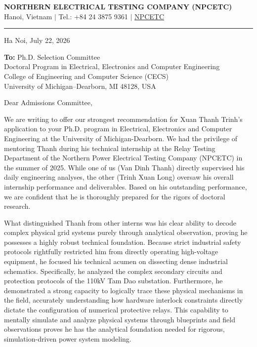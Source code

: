 \documentclass[11pt,letterpaper]{article}
\begin{document}
\begin{center}
{\LARGE \textbf{NORTHERN ELECTRICAL TESTING COMPANY (NPCETC)}}\\[1.5ex]
{\small Hanoi, Vietnam $\vert$ Tel.: +84 24 3875 9361 $\vert$ \href{https://www.npcetc.vn}{NPCETC}}
\end{center}
\vspace{-3ex}
\noindent\rule{\textwidth}{0.4pt}
\vspace{-2ex}

\noindent Ha Noi, July 22, 2026

\vspace{0.2ex}

\noindent
\textbf{To:} Ph.D. Selection Committee \\
Doctoral Program in Electrical, Electronics and Computer Engineering \\
College of Engineering and Computer Science (CECS) \\
University of Michigan--Dearborn, MI 48128, USA

\vspace{2ex}

\noindent Dear Admissions Committee,

We are writing to offer our strongest recommendation for Xuan Thanh Trinh's application to your Ph.D. program in Electrical, Electronics and Computer Engineering at the University of Michigan-Dearborn. We had the privilege of mentoring Thanh during his technical internship at the Relay Testing Department of the Northern Power Electrical Testing Company (NPCETC) in the summer of 2025. While one of us (Van Dinh Thanh) directly supervised his daily engineering analyses, the other (Trinh Xuan Long) oversaw his overall internship performance and deliverables. Based on his outstanding performance, we are confident that he is thoroughly prepared for the rigors of doctoral research.

What distinguished Thanh from other interns was his clear ability to decode complex physical grid systems purely through analytical observation, proving he possesses a highly robust technical foundation. Because strict industrial safety protocols rightfully restricted him from directly operating high-voltage equipment, he focused his technical acumen on dissecting dense industrial schematics. Specifically, he analyzed the complex secondary circuits and protection protocols of the 110kV Tam Dao substation. Furthermore, he demonstrated a strong capacity to logically trace these physical mechanisms in the field, accurately understanding how hardware interlock constraints directly dictate the configuration of numerical protective relays. This capability to mentally simulate and analyze physical systems through blueprints and field observations proves he has the analytical foundation needed for rigorous, simulation-driven power system modeling.
\end{document}
